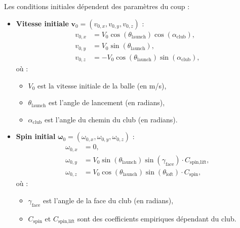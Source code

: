 \documentclass[11pt, a4paper]{article}
\newcommand{\vb}[1]{\mathbf{#1}}       %
\newcommand{\uvb}[1]{\hat{\mathbf{#1}}} %
\begin{document}
Les conditions initiales dépendent des paramètres du coup :
\begin{itemize}
    \item \textbf{Vitesse initiale} $\vb{v}_0 = (v_{0,x}, v_{0,y}, v_{0,z})$ :
    \begin{equation}
        \begin{aligned}
            v_{0,x} &= V_0 \cos(\theta_\text{launch}) \cos(\alpha_\text{club}), \\
            v_{0,y} &= V_0 \sin(\theta_\text{launch}), \\
            v_{0,z} &= -V_0 \cos(\theta_\text{launch}) \sin(\alpha_\text{club}),
        \end{aligned}
    \end{equation}
    où :
    \begin{itemize}
        \item $V_0$ est la vitesse initiale de la balle (en m/s),
        \item $\theta_\text{launch}$ est l'angle de lancement (en radians),
        \item $\alpha_\text{club}$ est l'angle du chemin du club (en radians).
    \end{itemize}

    \item \textbf{Spin initial} $\vb{\omega}_0 = (\omega_{0,x}, \omega_{0,y}, \omega_{0,z})$ :
    \begin{equation}
        \begin{aligned}
            \omega_{0,x} &= 0, \\
            \omega_{0,y} &= V_0 \sin(\theta_\text{launch}) \sin(\gamma_\text{face}) \cdot C_{\text{spin,lift}}, \\
            \omega_{0,z} &= V_0 \cos(\theta_\text{launch}) \sin(\theta_\text{loft}) \cdot C_{\text{spin}},
        \end{aligned}
    \end{equation}
    où :
    \begin{itemize}
        \item $\gamma_\text{face}$ est l'angle de la face du club (en radians),
        \item $C_{\text{spin}}$ et $C_{\text{spin,lift}}$ sont des coefficients empiriques dépendant du club.
    \end{itemize}
\end{itemize}


\newcommand{\vb}[1]{\mathbf{#1}}       %
\newcommand{\uvb}[1]{\hat{\mathbf{#1}}} %
\end{document}
